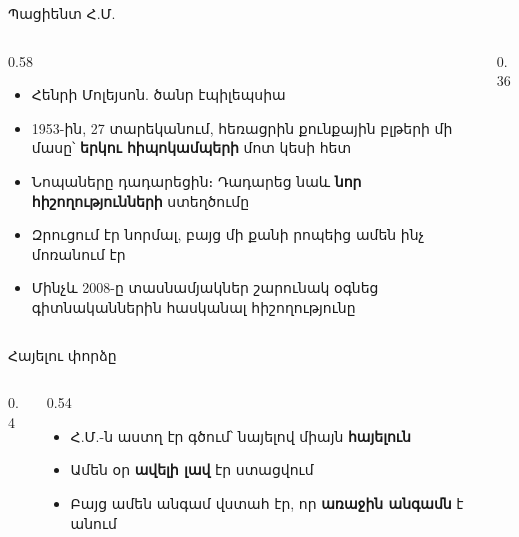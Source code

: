 \begin{frame}{Պացիենտ Հ.Մ.}
  \begin{columns}[c]
    \begin{column}{0.58\textwidth}
      \begin{itemize}
        \item Հենրի Մոլեյսոն. ծանր էպիլեպսիա
        \item 1953-ին, 27 տարեկանում, հեռացրին քունքային բլթերի մի մասը՝ \textbf{երկու հիպոկամպերի} մոտ կեսի հետ
        \item<2-> Նոպաները դադարեցին։ Դադարեց նաև \textbf{նոր հիշողությունների} ստեղծումը
        \item<3-> Զրուցում էր նորմալ, բայց մի քանի րոպեից ամեն ինչ մոռանում էր
        \item<4-> Մինչև 2008-ը տասնամյակներ շարունակ օգնեց գիտնականներին հասկանալ հիշողությունը
      \end{itemize}
    \end{column}
    \begin{column}{0.36\textwidth}
      \centering{}
    \end{column}
  \end{columns}
\end{frame}

\begin{frame}{Հայելու փորձը}
  \begin{columns}[c]
    \begin{column}{0.4\textwidth}
      \centering
    \end{column}
    \begin{column}{0.54\textwidth}
      \begin{itemize}
        \item Հ.Մ.-ն աստղ էր գծում՝ նայելով միայն \textbf{հայելուն}
        \item<2-> Ամեն օր \textbf{ավելի լավ} էր ստացվում
        \item<3-> Բայց ամեն անգամ վստահ էր, որ \textbf{առաջին անգամն} է անում
      \end{itemize}
      \vspace{2mm}
    \end{column}
  \end{columns}
\end{frame}

